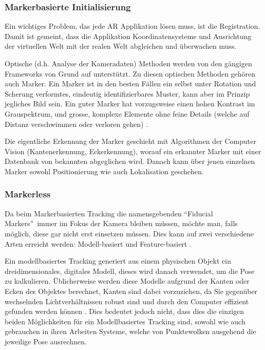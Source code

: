 \documentclass[a4paper]{scrreprt}
\begin{document}
\subsubsection{Markerbasierte Initialisierung}
Ein wichtiges Problem, das jede AR Applikation lösen muss, ist die Registration. Damit ist gemeint, dass die Applikation Koordinatensysteme und Ausrichtung der virtuellen Welt mit der realen Welt abgleichen und überwachen muss.

Optische (d.h. Analyse der Kameradaten) Methoden werden von den gängigen Frameworks von Grund auf unterstützt. Zu diesen optischen Methoden gehören auch Marker. Ein Marker ist in den besten Fällen ein selbst unter Rotation und Scherung verformtes, eindeutig identifizierbares Muster, kann aber im Prinzip jegliches Bild sein. Ein guter Marker hat vorzugsweise einen hohen Kontrast im Grauspektrum, und grosse, komplexe Elemente ohne feine Details (welche auf Distanz verschwimmen oder verloren gehen) \parencite{Kudan2016}.

Die eigentliche Erkennung der Marker geschieht mit Algorithmen der Computer Vision (Kantenerkennung, Eckerkennung), worauf ein erkannter Marker mit einer Datenbank von bekannten abgeglichen wird. Danach kann über jenen einzelnen Marker sowohl Positionierung wie auch Lokalisation geschehen.

\subsubsection{Markerless}
Da beim Markerbasierten Tracking die namensgebenden \textquotedblleft Fiducial Markers\textquotedblright\ immer im Fokus der Kamera bleiben müssen, möchte man, falls möglich, diese gar nicht erst einsetzen müssen. Dies kann auf zwei verschiedene Arten erreicht werden: Modell-basiert und Feature-basiert \parencite{Ziegler2009}.

Ein modellbasiertes Tracking generiert aus einem physischen Objekt ein dreidimensionales, digitales Modell, dieses wird danach verwendet, um die Pose zu kalkulieren. Üblicherweise werden diese Modelle aufgrund der Kanten oder Ecken des Objektes berechnet, Kanten sind dabei vorzuziehen, da Sie gegenüber wechselnden Lichtverhältnissen robust sind und durch den Computer effizient gefunden werden können \parencite{Zhou2008}. Dies bedeutet jedoch nicht, dass dies die einzigen beiden Möglichkeiten für ein Modellbasiertes Tracking sind, sowohl \citeauthor{PauloLima2017} wie auch \citeauthor{Cote2013} gebrauchen in ihren Arbeiten Systeme, welche von Punktewolken ausgehend die jeweilige Pose ausrechnen.
\end{document}
